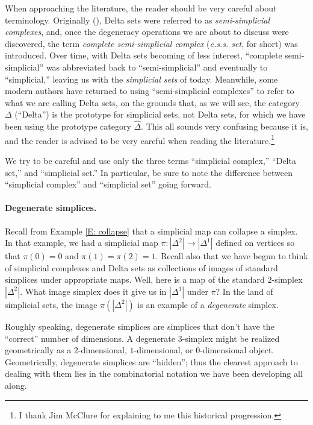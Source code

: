 \documentclass[12pt]{article}
\theoremstyle{plain}
\theoremstyle{definition}
\begin{document}
When approaching the literature, the reader should be very careful about terminology. Originally (\cite{EZ50}), Delta sets were referred to as \emph{semi-simplicial complexes}, and, once the degeneracy operations we are about to discuss were discovered, the term \emph{complete semi-simplicial complex} (\emph{c.s.s. set}, for short) was introduced. Over time, with Delta sets becoming of less interest,  ``complete semi-simplicial'' was abbreviated back to ``semi-simplicial'' and eventually to ``simplicial,'' leaving us with the \emph{simplicial sets} of today. Meanwhile, some modern authors have returned to using ``semi-simplicial complexes'' to refer to what we are calling Delta sets, on the grounds that, as we will see, the category $\Delta$ (``Delta'') is the prototype for simplicial sets, not Delta sets, for which we have been using the prototype category $\widehat \Delta$. This all sounds very confusing because it is, and the reader is advised to be very careful when reading the literature.\footnote{I thank Jim McClure for explaining to me this historical progression.}

We try to be careful and use only the three terms ``simplicial complex,'' ``Delta set,'' and ``simplicial set.'' In particular, be sure to note the difference between  ``simplicial complex'' and ``simplicial set'' going forward.









\paragraph{Degenerate simplices.}

Recall from Example \ref{E: collapse} that a simplicial map can collapse a simplex. In that example, we had a simplicial map $\pi\colon|\Delta^2|\to|\Delta^1|$ defined on vertices so that $\pi(0)=0$ and $\pi(1)=\pi(2)=1$. Recall also that we have begun to think of simplicial complexes and Delta sets as collections of images of standard simplices under appropriate maps. Well, here is a map of the standard $2$-simplex $|\Delta^2|$. What image simplex does it give us in $|\Delta^1|$ under $\pi$? In the land of simplicial sets, the image $\pi(|\Delta^2|)$ is an example of a \emph{degenerate} simplex.


Roughly speaking, degenerate simplices are simplices that don't have the ``correct'' number of dimensions. A degenerate $3$-simplex might be realized geometrically as a $2$-dimensional, $1$-dimensional, or $0$-dimensional object. Geometrically, degenerate simplices are ``hidden''; thus the clearest approach to dealing with them lies in the combinatorial notation we have been developing all along. 
\end{document}

